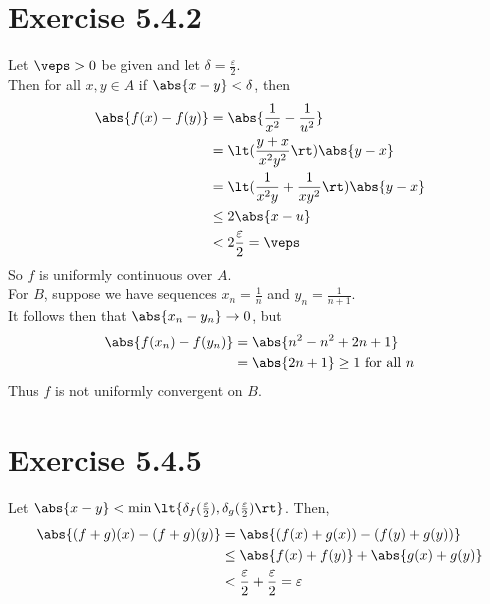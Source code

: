 \documentclass[11pt]{article}
\begin{document}
\section*{Exercise 5.4.2}\vspace{-1em}
    Let $\veps>0$ be given and let $\delta=\frac{\varepsilon}{2}$. \\
    Then for all $x,y\in A$ if $\abs{x-y}<\delta$, then
    \begin{align}
        \abs{f(x)-f(y)} &= \abs{\frac{1}{x^2}-\frac{1}{u^2}} \\
            &= \lt(\frac{y+x}{x^2y^2}\rt)\abs{y-x} \\
            &= \lt(\frac{1}{x^2y}+\frac{1}{xy^2}\rt)\abs{y-x}\\
            &\leq 2\abs{x-u}\\
            &< 2\frac{\varepsilon}{2}=\veps
    \end{align}
    So $f$ is uniformly continuous over $A$. \\
    For $B$, suppose we have sequences $x_n=\frac{1}{n}$ and $y_n=\frac{1}{n+1}$. \\
    It follows then that $\abs{x_n-y_n}\to 0$, but
    \begin{align}
        \abs{f(x_n)-f(y_n)} &= \abs{n^2-n^2+2n+1} \\
            &= \abs{2n+1} \geq 1 \text{ for all $n$}
    \end{align}
    Thus $f$ is not uniformly convergent on $B$.

\section*{Exercise 5.4.5}\vspace{-1em}
    Let $\abs{x-y}<\min\lt\{\delta_f(\frac{\varepsilon}{2}),\delta_g(\frac{\varepsilon}{2})\rt\}$. Then,
    \begin{align}
        \abs{(f+g)(x)-(f+g)(y)} &= \abs{(f(x)+g(x))-(f(y)+g(y))} \\
        &\leq \abs{f(x)+f(y)} + \abs{g(x)+g(y)} \\
        &< \frac{\varepsilon}{2}+\frac{\varepsilon}{2} = \varepsilon
    \end{align}
\end{document}
